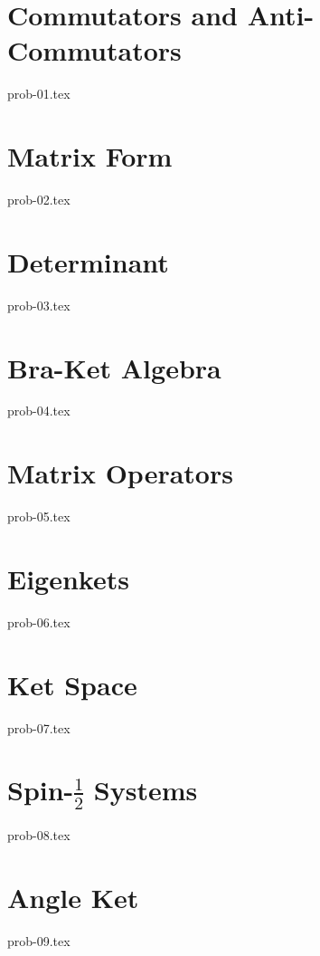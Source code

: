 \section{Commutators and Anti-Commutators}

{prob-01.tex}

\section{Matrix Form}

{prob-02.tex}

\section{Determinant}

{prob-03.tex}

\section{Bra-Ket Algebra}

{prob-04.tex}

\section{Matrix Operators}

{prob-05.tex}

\section{Eigenkets}

{prob-06.tex}

\section{Ket Space}

{prob-07.tex}

\section{Spin-$\frac{1}{2}$ Systems}\label{spinhalf}

{prob-08.tex}

\section{Angle Ket}\label{angleket}

{prob-09.tex}
